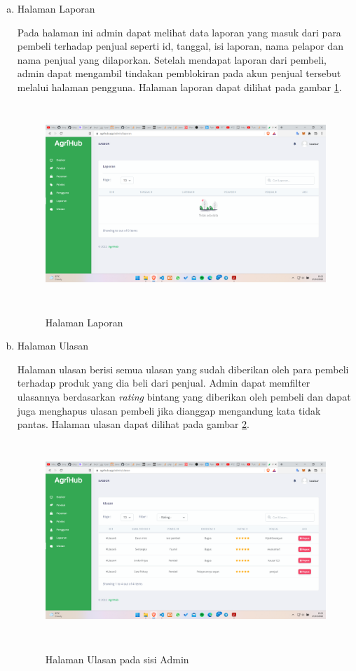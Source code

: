 \begin{enumerate}
\begin{enumerate}[a.]
		\item Halaman Laporan
		\par Pada halaman ini admin dapat melihat data laporan yang masuk dari para pembeli terhadap penjual seperti id, tanggal, isi laporan, nama pelapor dan nama penjual yang dilaporkan. Setelah mendapat laporan dari pembeli, admin dapat mengambil tindakan pemblokiran pada akun penjual tersebut melalui halaman pengguna. Halaman laporan dapat dilihat pada gambar \ref*{laporan}.
		\begin{figure}[H]
			\centering
			{\includegraphics [width = 13cm, height= 7.5cm]{gambar/admin/laporan}}
			\caption{Halaman Laporan}
			\label{laporan}
		\end{figure}

		\item Halaman Ulasan
		\par Halaman ulasan berisi semua ulasan yang sudah diberikan oleh para pembeli terhadap produk yang dia beli dari penjual. Admin dapat memfilter ulasannya berdasarkan \textit{rating} bintang yang diberikan oleh pembeli dan dapat juga menghapus ulasan pembeli jika dianggap mengandung kata tidak pantas. Halaman ulasan dapat dilihat pada gambar \ref*{ulasan_admin}.
		\begin{figure}[H]
			\centering
			{\includegraphics [width = 13cm, height= 7.5cm]{gambar/admin/ulasan_admin}}
			\caption{Halaman Ulasan pada sisi Admin}
			\label{ulasan_admin}
		\end{figure}
	\end{enumerate}


\end{enumerate}
